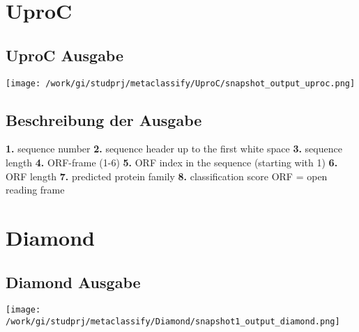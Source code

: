 \documentclass[11pt, a4paper]{scrartcl}
\begin{document}
\section{UproC}

\subsection{UproC Ausgabe}
\texttt{[image: /work/gi/studprj/metaclassify/UproC/snapshot\_output\_uproc.png]}
\linebreak

\subsection{Beschreibung der Ausgabe}
\begin{flushleft}
\textbf{1.} sequence number\linebreak
\textbf{2.} sequence header up to the first white space\linebreak
\textbf{3.} sequence length\linebreak
\textbf{4.} ORF-frame (1-6)\linebreak
\textbf{5.} ORF index in the sequence (starting with 1)\linebreak
\textbf{6.} ORF length\linebreak
\textbf{7.} predicted protein family\linebreak
\textbf{8.} classification score
\linebreak\linebreak
ORF = open reading frame
\end{flushleft}
\newpage

\section{Diamond}

\subsection{Diamond Ausgabe}
\texttt{[image: /work/gi/studprj/metaclassify/Diamond/snapshot1\_output\_diamond.png]}
\end{document}
